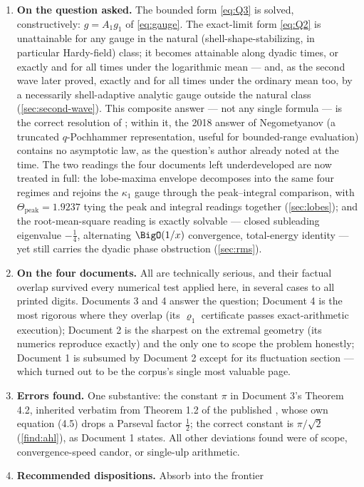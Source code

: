 \documentclass[11pt,oneside]{article}
\theoremstyle{definition}
\theoremstyle{remark}
\begin{document}
\begin{enumerate}
\item \textbf{On the question asked.}  The bounded form \eqref{eq:Q3} is
solved, constructively: $g=A_1g_1$ of \eqref{eq:gauge}.  The exact-limit
form \eqref{eq:Q2} is unattainable for any gauge in the natural
(shell-shape-stabilizing, in particular Hardy-field) class; it becomes
attainable along dyadic times, or exactly and for all times under the
logarithmic mean --- and, as the second wave later proved, exactly and
for all times under the ordinary mean too, by a necessarily
shell-adaptive analytic gauge outside the natural class
(\cref{sec:second-wave}).  This composite answer --- not any single formula ---
is the correct resolution of \cite{mse-decay}; within it, the 2018
answer of Negometyanov (a truncated $q$-Pochhammer representation,
useful for bounded-range evaluation) contains no asymptotic law, as the
question's author already noted at the time.  The two readings the four
documents left underdeveloped are now treated in full: the lobe-maxima
envelope decomposes into the same four regimes and rejoins the
$\kappa_1$ gauge through the peak--integral comparison, with
$\Theta_{\mathrm{peak}}=1.9237$ tying the peak and integral readings
together (\cref{sec:lobes}); and the root-mean-square reading is exactly
solvable --- closed subleading eigenvalue $-\tfrac14$, alternating
$\BigO(1/x)$ convergence, total-energy identity --- yet still carries
the dyadic phase obstruction (\cref{sec:rms}).
\item \textbf{On the four documents.}  All are technically serious, and
their factual overlap survived every numerical test applied here, in
several cases to all printed digits.  Documents 3 and 4 answer the
question; Document 4 is the most rigorous where they overlap (its
$\varrho_1$ certificate passes exact-arithmetic execution); Document 2
is the sharpest on the extremal geometry (its numerics reproduce
exactly) and the only one to scope the problem honestly; Document 1 is
subsumed by Document 2 except for its fluctuation section --- which
turned out to be the corpus's single most valuable page.
\item \textbf{Errors found.}  One substantive: the constant $\pi$ in
Document 3's Theorem 4.2, inherited verbatim from Theorem 1.2 of the
published \cite{ahl2017}, whose own equation (4.5) drops a Parseval
factor $\tfrac12$; the correct constant is $\pi/\sqrt2$
(\cref{find:ahl}), as Document 1 states.  All other deviations found
were of scope, convergence-speed candor, or single-ulp arithmetic.
\item \textbf{Recommended dispositions.}  Absorb into the frontier

\end{enumerate}
\end{document}
